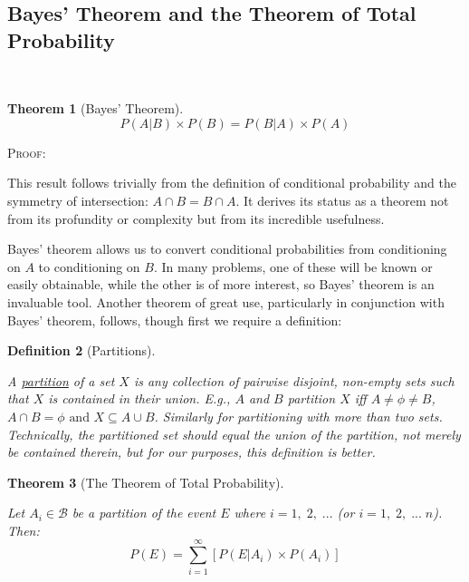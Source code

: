 \documentclass[12pt,a4paper]{article}
\newtheorem{thm}{Theorem}[subsection]
\newtheorem{defn}[thm]{Definition}
\begin{document}
\subsection{Bayes' Theorem and the Theorem of Total Probability}\label{total prob}$\;$

\begin{thm}[Bayes' Theorem]
$$P(A|B) \times P(B) = P(B|A) \times P(A)$$
\end{thm}

\noindent \textsc{Proof:}\par
\vspace{12pt}
\indent This result follows trivially from the definition of conditional probability and the symmetry of intersection: $A \cap B = B \cap A$. It derives its status as a theorem not from its profundity or complexity but from its incredible usefulness.

Bayes' theorem allows us to convert conditional probabilities from conditioning on $A$ to conditioning on $B$. In many problems, one of these will be known or easily obtainable, while the other is of more interest, so Bayes' theorem is an invaluable tool. Another theorem of great use, particularly in conjunction with Bayes' theorem, follows, though first we require a definition:

\begin{defn}[Partitions]$\;$\par
\vspace{12pt}

A \underline{partition} of a set $X$ is any collection of pairwise disjoint, non-empty sets such that $X$ is contained in their union. E.g., $A$ and $B$ partition $X$ iff $A\neq \phi \neq B$, $A \cap B = \phi \text{ and } X \subseteq A \cup B$. Similarly for partitioning with more than two sets. Technically, the partitioned set should \emph{equal} the union of the partition, not merely be contained therein, but for our purposes, this definition is better.

\end{defn}

\begin{thm}[The Theorem of Total Probability]$\;$\par
\vspace{12pt}

Let $A_i \in \mathcal{B}$ be a partition of the event $E$ where $i = 1,\;2,\;...$ (or $i = 1,\;2,\;...\;n$). Then:
$$P(E) = \sum_{i=1}^{\infty}[P(E|A_i) \times P(A_i)]$$
\end{thm}
\end{document}
